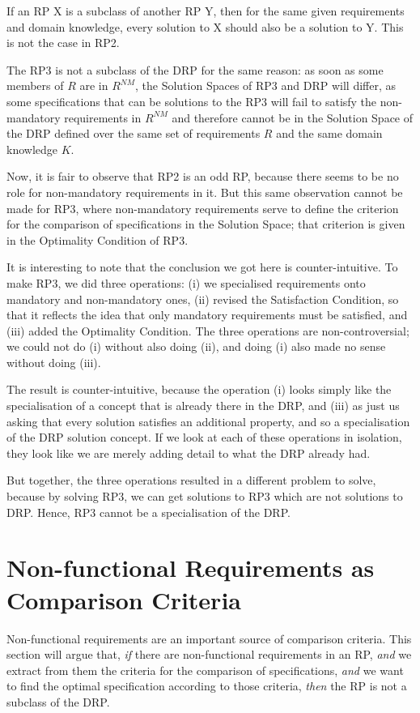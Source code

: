 \documentclass[graybox]{svmult}
\newcommand{\zi}[1]{\textit{#1}}
\newcommand{\RP}{RP}
\newcommand{\ZJRP}{DRP}
\newcommand{\SatisfactionCondition}{Satisfaction Condition}
\newcommand{\OptimalityCondition}{Optimality Condition}
\newcommand{\SolutionSpace}{Solution Space}
\begin{document}
If an \RP{} X is a subclass of another \RP{} Y, then for the same given requirements and domain knowledge, every solution to X should also be a solution to Y. This is not the case in RP2.

The RP3 is not a subclass of the \ZJRP{} for the same reason: as soon as some members of $R$ are in $R^{NM}$, the \SolutionSpace s of RP3 and \ZJRP{} will differ, as some specifications that can be solutions to the RP3 will fail to satisfy the non-mandatory requirements in $R^{NM}$ and therefore cannot be in the \SolutionSpace{} of the \ZJRP{} defined over the same set of requirements $R$ and the same domain knowledge $K$.

Now, it is fair to observe that RP2 is an odd \RP, because there seems to be no role for non-mandatory requirements in it. But this same observation cannot be made for RP3, where non-mandatory requirements serve to define the criterion for the comparison of specifications in the \SolutionSpace; that criterion is given in the \OptimalityCondition{} of RP3. 

It is interesting to note that the conclusion we got here is counter-intuitive. To make RP3, we did three operations: (i) we specialised requirements onto mandatory and non-mandatory ones, (ii) revised the \SatisfactionCondition, so that it reflects the idea that only mandatory requirements must be satisfied, and (iii) added the \OptimalityCondition. The three operations are non-controversial; we could not do (i) without also doing (ii), and doing (i) also made no sense without doing (iii). 

The result is counter-intuitive, because the operation (i) looks simply like the specialisation of a concept that is already there in the \ZJRP, and (iii) as just us asking that every solution satisfies an additional property, and so a specialisation of the \ZJRP{} solution concept. If we look at each of these operations in isolation, they look like we are merely adding detail to what the \ZJRP{} already had.

But together, the three operations resulted in a different problem to solve, because by solving RP3, we can get solutions to RP3 which are not solutions to \ZJRP. Hence, RP3 cannot be a specialisation of the \ZJRP.



%
\section{Non-functional Requirements as Comparison Criteria}\label{s:non-functional-requirements}
Non-functional requirements are an important source of comparison criteria. This section will argue that, \zi{if} there are non-functional requirements in an \RP, \zi{and} we extract from them the criteria for the comparison of specifications, \zi{and} we want to find the optimal specification according to those criteria, \zi{then} the \RP{} is not a subclass of the \ZJRP.
\end{document}

